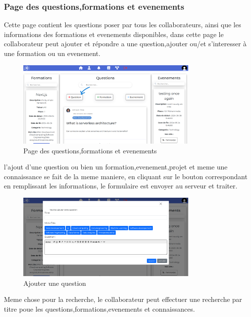 \documentclass{article}
\begin{document}
            \subsubsection{Page des questions,formations et evenements}
                Cette page contient les questions poser par tous les collaborateurs, ainsi que les informations des formations et evenements disponibles, dans cette page le collaborateur peut ajouter et répondre a une question,ajouter ou/et s'interesser à une formation ou un evenement.
                \begin{figure}[h!]
                    \centering
                    \includegraphics[width=0.8\textwidth]{assets/webSite/Acceuil.png}
                    \caption{Page des questions,formations et evenements}
                \end{figure}
                \FloatBarrier
                l'ajout d'une question ou bien un formation,evenement,projet et meme une connaissance se fait de la meme maniere, en cliquant sur le bouton correspondant en remplissant les informations, le formulaire est envoyer au serveur et traiter.
                \begin{figure}[h!]
                    \centering
                    \includegraphics[width=0.8\textwidth]{assets/webSite/addQuestion.png}
                    \caption{Ajouter une question}
                \end{figure}
                \FloatBarrier
                Meme chose pour la recherche, le collaborateur peut effectuer une recherche par titre poue les questions,formations,evenements et connaissances.
\end{document}
